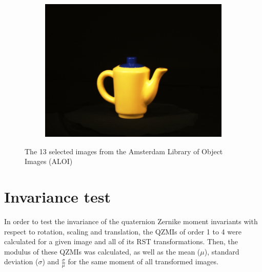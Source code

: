 \begin{figure}[tbp]
\begin{subfigure}{80pt}
    \includegraphics[width=\textwidth]{figures/aloi_original/875.png}
    \caption{}
	\end{subfigure}
	\caption{The 13 selected images from the Amsterdam Library of Object Images (ALOI)}
	\label{fig:aloi_original}

\end{figure}

\section{Invariance test}
In order to test the invariance of the quaternion Zernike moment invariants with respect to rotation, scaling and translation, the QZMIs of order 1 to 4 were calculated for a given image and all of its RST transformations. Then, the modulus of these QZMIs was calculated, as well as the mean ($\mu$), standard deviation ($\sigma$) and $\frac{\sigma}{\mu}$ for the same moment of all transformed images.

